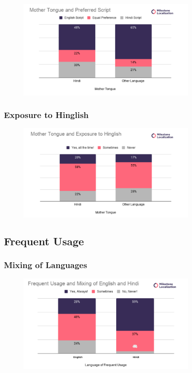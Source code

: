 \documentclass{article}
\begin{document}
\begin{figure}[H]
    \centering
    \includegraphics[width=0.8\textwidth]{plots/mother_preferred_script.png}
\end{figure}


\subsubsection{Exposure to Hinglish}

\begin{figure}[H]
    \centering
    \includegraphics[width=0.8\textwidth]{plots/mother_exposure.png}
\end{figure}


\subsection{Frequent Usage}

\subsubsection{Mixing of Languages}

\begin{figure}[H]
    \centering
    \includegraphics[width=0.8\textwidth]{plots/frequent_mixing_language.png}
\end{figure}
\end{document}
